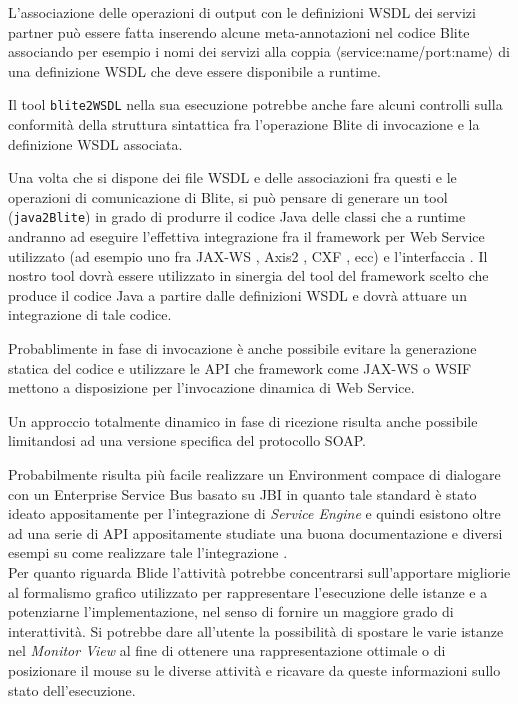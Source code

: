 L'associazione delle operazioni di output con le definizioni WSDL dei servizi
partner può essere fatta inserendo alcune meta-annotazioni nel codice Blite
associando per esempio i nomi dei servizi alla coppia
$\langle$service:name/port:name$\rangle$ di una definizione WSDL che deve
essere disponibile a runtime.

Il tool \texttt{blite2WSDL} nella sua esecuzione potrebbe anche fare alcuni
controlli sulla conformità della struttura sintattica fra l'operazione Blite di
invocazione e la definizione WSDL associata.

Una volta che si dispone dei file WSDL e delle associazioni fra questi e le
operazioni di comunicazione di Blite, si può pensare di generare un tool
(\texttt{java2Blite}) in grado di produrre il codice Java delle classi che a
runtime andranno ad eseguire l'effettiva integrazione fra il framework per Web
Service utilizzato (ad esempio uno fra JAX-WS \cite{JAXWS}, Axis2 \cite{AXIS},
CXF \cite{CXF}, ecc) e l'interfaccia . Il nostro tool
dovrà essere utilizzato in sinergia del tool del framework scelto che produce il codice Java a partire dalle definizioni
WSDL e dovrà attuare un integrazione di tale codice.

Probablimente in fase di invocazione è anche possibile evitare la generazione
statica del codice e utilizzare le API che framework come JAX-WS o WSIF mettono
a disposizione per l'invocazione dinamica di Web Service.

Un approccio totalmente dinamico in fase di ricezione risulta anche possibile
limitandosi ad una versione specifica del protocollo SOAP.

Probabilmente risulta più facile realizzare un Environment compace di dialogare
con un Enterprise Service Bus basato su JBI in quanto tale standard è stato
ideato appositamente per l'integrazione di \emph{Service Engine} e quindi
esistono oltre ad una serie di API appositamente studiate una buona
documentazione e diversi esempi su come realizzare tale l'integrazione
\cite{OPENESB}.
\\

Per quanto riguarda Blide l'attività potrebbe concentrarsi sull'apportare
migliorie al formalismo grafico utilizzato per rappresentare l'esecuzione delle
istanze e a potenziarne l'implementazione, nel senso di fornire un maggiore
grado di interattività. Si potrebbe dare all'utente la possibilità di spostare
le varie istanze nel \emph{Monitor View} al fine di ottenere una
rappresentazione ottimale o di posizionare il mouse su le diverse attività e
ricavare da queste informazioni sullo stato dell'esecuzione.





